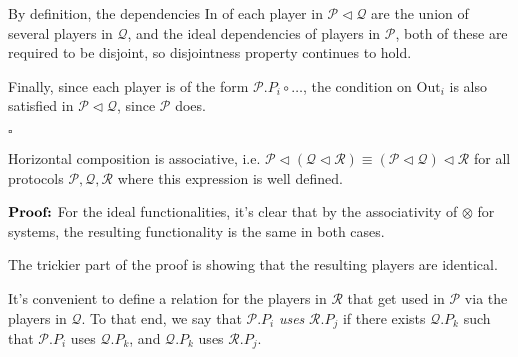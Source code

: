 \begin{definition}
By definition, the dependencies $\text{In}$ of each player in $\mathscr{P} \lhd \mathscr{Q}$
are the union of several players in $\mathscr{Q}$, and
the ideal dependencies of players in $\mathscr{P}$,
both of these are required to be disjoint, so disjointness property
continues to hold.

Finally, since each player is of the form $\mathscr{P}.P_i \circ \ldots$,
the condition on $\text{Out}_i$ is also satisfied in $\mathscr{P} \lhd \mathscr{Q}$,
since $\mathscr{P}$ does.

$\square$

\end{definition}

\begin{lemma}
Horizontal composition is associative, i.e.
${\mathscr{P} \lhd (\mathscr{Q} \lhd \mathscr{R}) \equiv (\mathscr{P} \lhd \mathscr{Q}) \lhd \mathscr{R}}$
for all protocols $\mathscr{P}, \mathscr{Q}, \mathscr{R}$ where this expression is well defined.

$\textbf{Proof:}$
For the ideal functionalities, it's clear that by the associativity
of $\otimes$ for systems, the resulting functionality is the same
in both cases.

The trickier part of the proof is showing that the resulting players
are identical.

It's convenient to define a relation for the players in $\mathscr{R}$
that get used in $\mathscr{P}$ via the players in $\mathscr{Q}$.
To that end, we say that $\mathscr{P}.P_i$ \emph{uses} $\mathscr{R}.P_j$
if there exists $\mathscr{Q}.P_k$ such that $\mathscr{P}.P_i$ uses
$\mathscr{Q}.P_k$, and $\mathscr{Q}.P_k$ uses $\mathscr{R}.P_j$.


\end{lemma}
